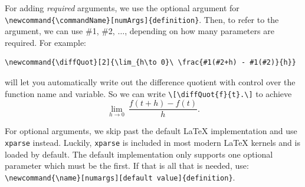 \documentclass[]{article}
\newcommand{\diffQuot}[2]{\lim_{h\to 0}\ \frac{#1(#2+h) - #1(#2)}{h}}
\begin{document}
For adding \emph{required} arguments, we use the optional argument for \verb|\newcommand{\commandName}[numArgs]{definition}|. Then, to refer to the argument, we can use \#1, \#2, $\dots$, depending on how many parameters are required. For example:
\begin{verbatim}
\newcommand{\diffQuot}[2]{\lim_{h\to 0}\ \frac{#1(#2+h) - #1(#2)}{h}}
\end{verbatim}
will let you automatically write out the difference quotient with control over the function name and variable. So we can write \verb|\[\diffQuot{f}{t}.\]| to achieve \[\diffQuot{f}{t}.\]

For optional arguments, we skip past the default LaTeX implementation and use \verb|xparse| instead. Luckily, \verb|xparse| is included in most modern LaTeX kernels and is loaded by default. The default implementation only supports one optional parameter which must be the first. If that is all that is needed, use: \verb|\newcommand{\name}[numargs][default value]{definition}|.
\end{document}
